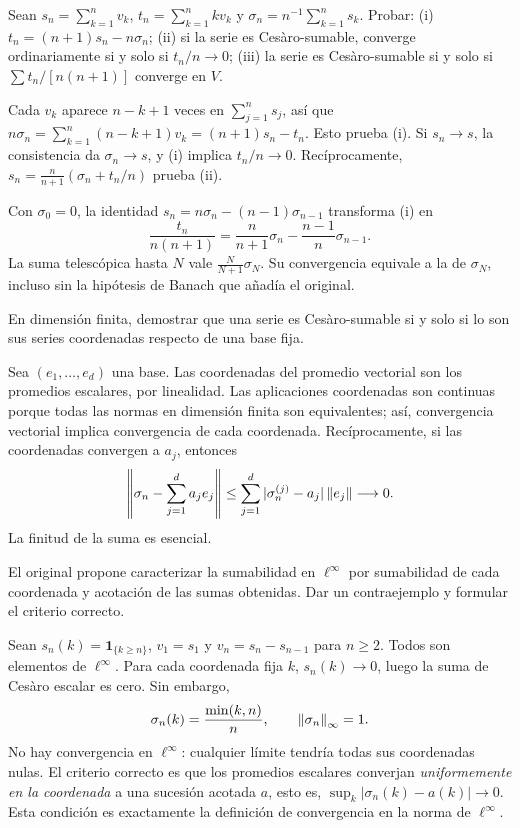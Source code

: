 \begin{ejercicio}\label{ej:v4-l01-3}
Sean $s_n=\sum_{k=1}^nv_k$, $t_n=\sum_{k=1}^nkv_k$ y $\sigma_n=n^{-1}\sum_{k=1}^ns_k$. Probar: (i) $t_n=(n+1)s_n-n\sigma_n$; (ii) si la serie es Cesàro-sumable, converge ordinariamente si y solo si $t_n/n\to0$; (iii) la serie es Cesàro-sumable si y solo si $\sum t_n/[n(n+1)]$ converge en $V$.
\end{ejercicio}
\begin{solucion}
Cada $v_k$ aparece $n-k+1$ veces en $\sum_{j=1}^ns_j$, así que $n\sigma_n=\sum_{k=1}^n(n-k+1)v_k=(n+1)s_n-t_n$. Esto prueba (i). Si $s_n\to s$, la consistencia da $\sigma_n\to s$, y (i) implica $t_n/n\to0$. Recíprocamente, $s_n=\frac n{n+1}(\sigma_n+t_n/n)$ prueba (ii).

Con $\sigma_0=0$, la identidad $s_n=n\sigma_n-(n-1)\sigma_{n-1}$ transforma (i) en
\[
 \frac{t_n}{n(n+1)}=\frac n{n+1}\sigma_n-\frac{n-1}{n}\sigma_{n-1}.
\]
La suma telescópica hasta $N$ vale $\frac N{N+1}\sigma_N$. Su convergencia equivale a la de $\sigma_N$, incluso sin la hipótesis de Banach que añadía el original.
\end{solucion}

\begin{ejercicio}\label{ej:v4-l01-4}
En dimensión finita, demostrar que una serie es Cesàro-sumable si y solo si lo son sus series coordenadas respecto de una base fija.
\end{ejercicio}
\begin{solucion}
Sea $(e_1,\ldots,e_d)$ una base. Las coordenadas del promedio vectorial son los promedios escalares, por linealidad. Las aplicaciones coordenadas son continuas porque todas las normas en dimensión finita son equivalentes; así, convergencia vectorial implica convergencia de cada coordenada. Recíprocamente, si las coordenadas convergen a $a_j$, entonces
\[
 \left\|\sigma_n-\sum_{j=1}^da_je_j\right\|
 \leq\sum_{j=1}^d|\sigma_n^{(j)}-a_j|\left\lVert e_j\right\rVert\longrightarrow0.
\]
La finitud de la suma es esencial.
\end{solucion}

\begin{ejercicio}\label{ej:v4-l01-5}
El original propone caracterizar la sumabilidad en $\ell^\infty$ por sumabilidad de cada coordenada y acotación de las sumas obtenidas. Dar un contraejemplo y formular el criterio correcto.
\end{ejercicio}
\begin{solucion}
Sean $s_n(k)=\mathbf1_{\{k\geq n\}}$, $v_1=s_1$ y $v_n=s_n-s_{n-1}$ para $n\geq2$. Todos son elementos de $\ell^\infty$. Para cada coordenada fija $k$, $s_n(k)\to0$, luego la suma de Cesàro escalar es cero. Sin embargo,
\[
 \sigma_n(k)=\frac{\min(k,n)}n,\qquad \left\lVert\sigma_n\right\rVert_\infty=1.
\]
No hay convergencia en $\ell^\infty$: cualquier límite tendría todas sus coordenadas nulas. El criterio correcto es que los promedios escalares converjan \emph{uniformemente en la coordenada} a una sucesión acotada $a$, esto es, $\sup_k|\sigma_n(k)-a(k)|\to0$. Esta condición es exactamente la definición de convergencia en la norma de $\ell^\infty$.
\end{solucion}


